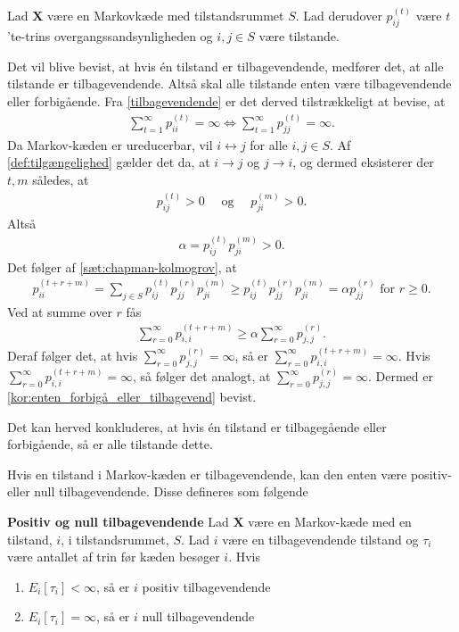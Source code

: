\begin{bev} \textbf{} %
\newline
Lad $\bm X$ være en Markovkæde med tilstandsrummet $S$. Lad derudover $p_{ij}^{(t)}$ være $t$'te-trins overgangssandsynligheden og $i,j \in S$ være tilstande.

Det vil blive bevist, at hvis én tilstand er tilbagevendende, medfører det, at alle tilstande er tilbagevendende. Altså skal alle tilstande enten være tilbagevendende eller forbigående. Fra \autoref{tilbagevendende} er det derved tilstrækkeligt at bevise, at %
\begin{align*}
    \sum_{t=1}^\infty p_{ii}^{(t)}=\infty \Leftrightarrow  \sum_{t=1}^\infty p_{jj}^{(t)}=\infty.
\end{align*}
%
Da Markov-kæden er ureducerbar, vil $i \leftrightarrow j$ for alle $i,j \in S$. Af \autoref{def:tilgængelighed} gælder det da, at $i \to j$ og $j \to i$, og dermed eksisterer der $t,m$ således, at
\begin{align*}
    p_{ij}^{(t)} > 0 \quad \text{ og } \quad p_{ji}^{(m)} > 0.
\end{align*}
Altså
\begin{align*}
    \alpha = p_{ij}^{(t)}p_{ji}^{(m)} > 0.
\end{align*}
Det følger af \autoref{sæt:chapman-kolmogrov}, at
\begin{align*}
    p_{ii}^{(t+r+m)} = \sum_{j \in S} p_{ij}^{(t)} p_{jj}^{(r)}p_{ji}^{(m)} \geq p_{ij}^{(t)} p_{jj}^{(r)}p_{ji}^{(m)} = \alpha p_{jj}^{(r)} \text{ for } r \geq 0.
\end{align*}
Ved at summe over $r$ fås
\begin{align*}
    \sum_{r=0}^\infty p_{i,i}^{(t+r+m)} \geq \alpha \sum_{r=0}^\infty p_{j,j}^{(r)}.
\end{align*}
Deraf følger det, at hvis $\displaystyle\sum_{r=0}^\infty p_{j,j}^{(r)}= \infty$, så er $\displaystyle\sum_{r=0}^\infty p_{i,i}^{(t+r+m)} = \infty$. Hvis $\displaystyle\sum_{r=0}^\infty p_{i,i}^{(t+r+m)} = \infty$, så følger det analogt, at $\displaystyle\sum_{r=0}^\infty p_{j,j}^{(r)}= \infty$. Dermed er \autoref{kor:enten_forbigå_eller_tilbagevend} bevist.
\end{bev}
Det kan herved konkluderes, at hvis én tilstand er tilbagegående eller forbigående, så er alle tilstande dette.

Hvis en tilstand i Markov-kæden er tilbagevendende, kan den enten være positiv- eller null tilbagevendende. Disse defineres som følgende

\begin{defn}\textbf{Positiv og null tilbagevendende} %
\newline
Lad $\bm X$ være en Markov-kæde med en tilstand, $i$, i tilstandsrummet, $S$. Lad $i$ være en tilbagevendende tilstand og $\tau_i$ være antallet af trin før kæden besøger $i$. Hvis
\begin{enumerate}
    \item $E_i[\tau_i]<\infty$, så er $i$ positiv tilbagevendende
    \item $E_i[\tau_i]=\infty$, så er $i$ null tilbagevendende
\end{enumerate}
\end{defn}

